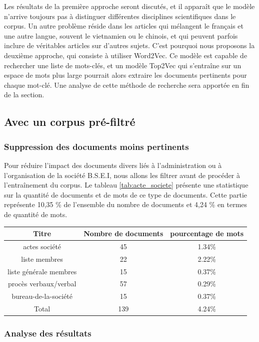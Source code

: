Les résultats de la première approche seront discutés, et il apparaît que le modèle n'arrive toujours pas à distinguer différentes disciplines scientifiques dans le corpus. Un autre problème réside dans les articles qui mélangent le français et une autre langue, souvent le vietnamien ou le chinois, et qui peuvent parfois inclure de véritables articles sur d'autres sujets.
C'est pourquoi nous proposons la deuxième approche, qui consiste à utiliser Word2Vec. Ce modèle est capable de rechercher une liste de mots-clés, et un modèle Top2Vec qui s'entraîne  sur un espace de mots plus large pourrait alors extraire les documents pertinents pour chaque mot-clé. 
Une analyse de cette méthode de recherche sera apportée en fin de la section.

\subsection{Avec un corpus pré-filtré}
\subsubsection{Suppression des documents moins pertinents}
Pour réduire l'impact des documents divers liés à l'administration ou à l'organisation de la société B.S.E.I, nous allons les filtrer avant de procéder à l'entraînement du corpus. Le tableau \ref{tab:acte_societe} présente une statistique sur la quantité de documents et de mots de ce type de documents. Cette partie représente 10,35 \% de l'ensemble du nombre de documents et 4,24 \% en termes de quantité de mots.
\begin{center}
\begin{tabular}{ |c|c|c| } %
\hline
Titre & Nombre de documents & pourcentage de mots\\
\hline
actes société & 45 & 1.34\%  \\ 
liste membres & 22 &  2.22\%  \\
liste générale membres & 15 & 0.37\%  \\
procès verbaux/verbal & 57 & 0.29\% \\ 
bureau-de-la-société & 15 & 0.37\%  \\
\hline
Total & 139 & 4.24\%  \\
\hline
\end{tabular}
\label{tab:acte_societe}
\end{center}

\subsubsection{Analyse des résultats}

